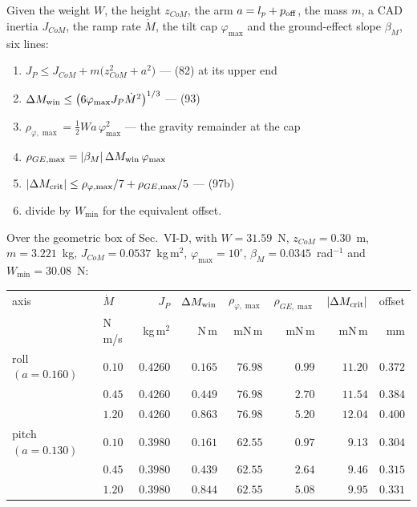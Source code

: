 \documentclass[11pt]{article}
\begin{document}
Given the weight $W$, the height $z_{CoM}$, the arm
$a = l_p + p_{\rm off}$, the mass $m$, a CAD inertia $J_{CoM}$, the
ramp rate $\dot M$, the tilt cap $\varphi_{\max}$ and the ground-effect
slope $\beta_M$, six lines:
\begin{enumerate}
\item[(1)] $J_P \le J_{CoM} + m\bigl(z_{CoM}^2 + a^2\bigr)$
  \hfill --- (82) at its upper end
\item[(2)] $\Delta M_{\rm win} \le
  \bigl(6\varphi_{\max}J_P\dot M^{2}\bigr)^{1/3}$ \hfill --- (93)
\item[(3)] $\rho_{\varphi,\max} = \tfrac12 W a\,\varphi_{\max}^{2}$
  \hfill --- the gravity remainder at the cap
\item[(4)] $\rho_{GE,\max} =
  |\beta_M|\,\Delta M_{\rm win}\,\varphi_{\max}$
\item[(5)] $|\Delta M_{\rm crit}| \le
  \rho_{\varphi,\max}/7 + \rho_{GE,\max}/5$ \hfill --- (97b)
\item[(6)] divide by $W_{\min}$ for the equivalent offset.
\end{enumerate}

Over the geometric box of Sec.~VI-D, with $W = 31.59$~N,
$z_{CoM} = 0.30$~m, $m = 3.221$~kg, $J_{CoM} = 0.0537$~kg\,m$^2$,
$\varphi_{\max} = 10^\circ$, $\beta_M = 0.0345$~rad$^{-1}$ and
$W_{\min} = 30.08$~N:

\begin{center}\small
\begin{tabular}{@{}llrrrrrr@{}}
\toprule
axis & $\dot M$ & $J_P$ & $\Delta M_{\rm win}$
 & $\rho_{\varphi,\max}$ & $\rho_{GE,\max}$
 & $|\Delta M_{\rm crit}|$ & offset \\
 & N\,m/s & kg\,m$^2$ & N\,m & mN\,m & mN\,m & mN\,m & mm \\
\midrule
roll $(a = 0.160)$  & $0.10$ & $0.4260$ & $0.165$ & $76.98$ & $0.99$
  & $11.20$ & $0.372$ \\
                    & $0.45$ & $0.4260$ & $0.449$ & $76.98$ & $2.70$
  & $11.54$ & $0.384$ \\
                    & $1.20$ & $0.4260$ & $0.863$ & $76.98$ & $5.20$
  & $12.04$ & $0.400$ \\
\midrule
pitch $(a = 0.130)$ & $0.10$ & $0.3980$ & $0.161$ & $62.55$ & $0.97$
  & $\phantom{0}9.13$ & $0.304$ \\
                    & $0.45$ & $0.3980$ & $0.439$ & $62.55$ & $2.64$
  & $\phantom{0}9.46$ & $0.315$ \\
                    & $1.20$ & $0.3980$ & $0.844$ & $62.55$ & $5.08$
  & $\phantom{0}9.95$ & $0.331$ \\
\bottomrule
\end{tabular}
\end{center}
\end{document}
